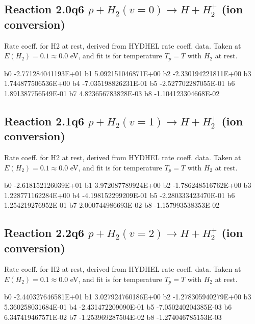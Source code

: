 \subsection{
Reaction 2.0q6
$ p + H_2(v=0) \rightarrow H + H_2^+$ (ion conversion)
}
Rate coeff. for H2 at rest, derived from HYDHEL rate coeff. data.
Taken at $E(H_2) = 0.1 \approx 0.0$ eV,  and fit is for temperature $T_p=T$ with $H_2$ at rest.

\begin{{small}}\begin{{verbatim}}

  b0 -2.771284041193E+01  b1  5.092151046871E+00  b2 -2.330194221811E+00
  b3  1.744877506536E+00  b4 -7.035198826231E-01  b5 -2.527702287055E-01
  b6  1.891387756549E-01  b7  4.823656783828E-03  b8 -1.104123304668E-02

\end{{verbatim}}\end{{small}}

\newpage
\subsection{
Reaction 2.1q6
$ p + H_2(v=1) \rightarrow H + H_2^+$ (ion conversion)
}
Rate coeff. for H2 at rest, derived from HYDHEL rate coeff. data.
Taken at $E(H_2) = 0.1 \approx 0.0$ eV,  and fit is for temperature $T_p=T$ with $H_2$ at rest.

\begin{{small}}\begin{{verbatim}}

  b0 -2.618152126039E+01  b1  3.972087789924E+00  b2 -1.786248516762E+00
  b3  1.228771162284E+00  b4 -4.198152299209E-01  b5 -2.280333423470E-01
  b6  1.254219276952E-01  b7  2.000744986693E-02  b8 -1.157993538353E-02

\end{{verbatim}}\end{{small}}

\newpage
\subsection{
Reaction 2.2q6
$ p + H_2(v=2) \rightarrow H + H_2^+$ (ion conversion)
}
Rate coeff. for H2 at rest, derived from HYDHEL rate coeff. data.
Taken at $E(H_2) = 0.1 \approx 0.0$ eV,  and fit is for temperature $T_p=T$ with $H_2$ at rest.

\begin{{small}}\begin{{verbatim}}

  b0 -2.440327646581E+01  b1  3.027924760186E+00  b2 -1.278305940279E+00
  b3  5.360258031684E-01  b4 -2.431472209090E-01  b5 -7.050240204385E-03
  b6  6.347419467571E-02  b7 -1.253969287504E-02  b8 -1.274046785153E-03

\end{{verbatim}}\end{{small}}

